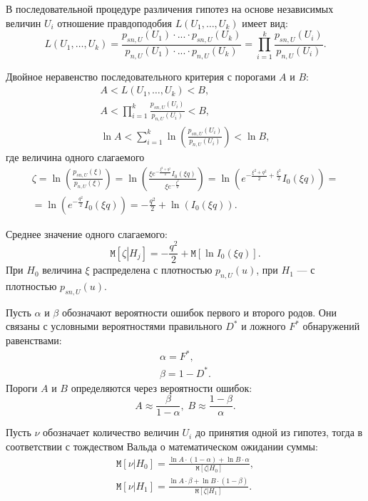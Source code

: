 \documentclass[a4paper,12pt]{article}
\newcommand{\expectation}[1]{\mathtt{M} \left [ #1 \right ]}
\begin{document}
    В последовательной процедуре различения гипотез на основе независимых величин $U_i$ отношение правдоподобия $L(U_1, \dots, U_k)$ имеет вид:
    \[
        L (U_1, \dots, U_k)
        = \frac{p_{sn,U}(U_1) \cdot ... \cdot p_{sn,U}(U_k)}{p_{n,U}(U_1) \cdot ... \cdot p_{n,U}(U_k)}
        = \prod_{i=1}^k \frac{p_{sn,U}(U_i)}{p_{n,U}(U_i)} .
    \]

    Двойное неравенство последовательного критерия с порогами $A$ и $B$:
    \begin{gather*}
        A < L (U_1, \dots, U_k) < B , \\
        A < \prod_{i=1}^k \frac{p_{sn,U}(U_i)}{p_{n,U}(U_i)} < B , \\
        \ln A < \sum_{i=1}^k \ln \left ( \frac{p_{sn,U}(U_i)}{p_{n,U}(U_i)} \right ) < \ln B ,
    \end{gather*}
    где величина одного слагаемого
    \begin{multline*}
        \zeta
        = \ln \left ( \frac{p_{sn,U}(\xi)}{p_{n,U}(\xi)} \right )
        = \ln \left ( \frac{\xi e^{- \frac{\xi^2 + q^2}{2}} I_0 \left ( \xi q \right )}{\xi e^{- \frac{\xi^2}{2}}} \right )
        = \ln \left ( e^{- \frac{\xi^2 + q^2}{2} + \frac{\xi^2}{2}} I_0 \left ( \xi q \right ) \right ) = \\
        = \ln \left ( e^{- \frac{q^2}{2}} I_0 \left ( \xi q \right ) \right )
        = - \frac{q^2}{2} + \ln \left ( I_0 \left ( \xi q \right ) \right ) .
    \end{multline*}

    Среднее значение одного слагаемого:
    \[
        \expectation{\zeta \left | H_j \right .} = - \frac{q^2}{2} + \expectation{\ln I_0 \left ( \xi q \right )} .
    \]
    При $H_0$ величина $\xi$ распределена с плотностью $p_{n,U}(u)$, при $H_1$ --- с плотностью $p_{sn,U}(u)$.

    Пусть $\alpha$ и $\beta$ обозначают вероятности ошибок первого и второго родов. Они связаны с условными вероятностями правильного $D^*$ и ложного $F^*$ обнаружений
    равенствами:
    \begin{gather*}
        \alpha = F^* , \\
        \beta = 1 - D^* .
    \end{gather*}
    Пороги $A$ и $B$ определяются через вероятности ошибок:
    \[
        A \approx \frac{\beta}{1 - \alpha} , \; B \approx \frac{1 - \beta}{\alpha} .
    \]

    Пусть $\nu$ обозначает количество величин $U_i$ до принятия одной из гипотез, тогда в соответствии с тождеством Вальда о математическом ожидании суммы:
    \begin{gather*}
        \expectation{\nu \left | H_0 \right .}
        = \frac{\ln A \cdot \left ( 1 - \alpha \right ) + \ln B \cdot \alpha}{\expectation{\zeta \left | H_0 \right .}} , \\
        \expectation{\nu \left | H_1 \right .}
        = \frac{\ln A \cdot \beta + \ln B \cdot \left ( 1 - \beta \right )}{\expectation{\zeta \left | H_1 \right .}} .
    \end{gather*}
\end{document}
